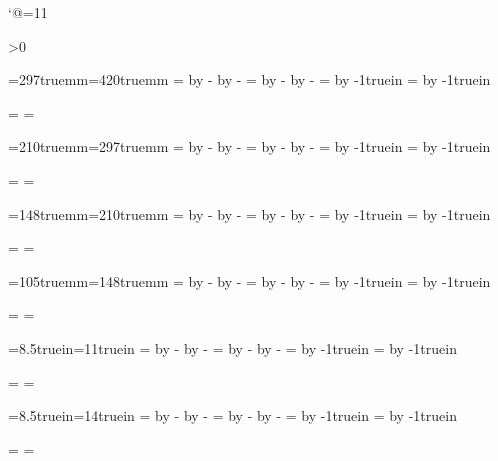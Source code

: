 

\catcode`@=11


\newif\ifpdf
\pdffalse

\ifx\pdfoutput\undefined
\else\ifnum\pdfoutput>0
	\pdftrue
\fi\fi


\newdimen\pagewidth
\newdimen\pageheight
\newdimen\leftmargin
\newdimen\rightmargin
\newdimen\topmargin
\newdimen\bottommargin
\newdimen\evenpageshift

\def\setuppage{%
	\hsize=\pagewidth
	\advance\hsize by -\leftmargin
	\advance\hsize by -\rightmargin
	\vsize=\pageheight
	\advance\vsize by -\topmargin
	\advance\vsize by -\bottommargin
	\hoffset=\leftmargin
	\advance\hoffset by -1truein
	\voffset=\topmargin
	\advance\voffset by -1truein
	\ifpdf
		\pdfpagewidth=\pagewidth
		\pdfpageheight=\pageheight
	\fi
}

\def\sethmargins#1{\leftmargin=#1\relax\rightmargin=#1\relax\evenpageshift=0pt\relax}
\def\setvmargins#1{\topmargin=#1\relax\bottommargin=#1\relax}
\def\setmargins#1{\sethmargins{#1}\setvmargins{#1}}

\def\setinneroutermargin#1#2{\sethmargins{#1}{#2}\evenpageshift=\rightmargin\advance\evenpageshift by -\leftmargin}

\def\setpaper#1{%
	\expandafter\let\expandafter\currentpaper\csname paper-#1\endcsname
	\ifx\currentpaper\relax
		\errmessage{Undefined paper format #1}
	\fi
	\currentpaper
}

\def\landscape{%
	\dimen0=\pageheight
	\pageheight=\pagewidth
	\pagewidth=\dimen0
	\setuppage
}

\def\defpaper#1#2#3{\expandafter\def\csname paper-#1\endcsname{\pagewidth=#2\pageheight=#3\setuppage}}
\defpaper{a3}{297truemm}{420truemm}
\defpaper{a4}{210truemm}{297truemm}
\defpaper{a5}{148truemm}{210truemm}
\defpaper{a6}{105truemm}{148truemm}
\defpaper{letter}{8.5truein}{11truein}
\defpaper{legal}{8.5truein}{14truein}


